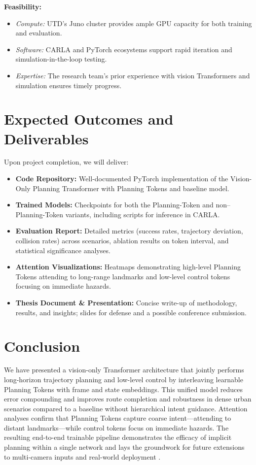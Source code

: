 \documentclass[11pt,a4paper]{article}
\begin{document}
\vspace{1em}

\noindent\textbf{Feasibility:}
\begin{itemize}[nosep]
    \item \emph{Compute:} UTD’s Juno cluster provides ample GPU capacity for both training and evaluation.
    \item \emph{Software:} CARLA and PyTorch ecosystems support rapid iteration and simulation-in-the-loop testing.
    \item \emph{Expertise:} The research team’s prior experience with vision Transformers and simulation ensures timely progress.
\end{itemize}


\section*{Expected Outcomes and Deliverables}
Upon project completion, we will deliver:

\begin{itemize}
    \item \textbf{Code Repository:} Well-documented PyTorch implementation of the Vision-Only Planning Transformer with Planning Tokens and baseline model.
    \item \textbf{Trained Models:} Checkpoints for both the Planning-Token and non–Planning-Token variants, including scripts for inference in CARLA.
    \item \textbf{Evaluation Report:} Detailed metrics (success rates, trajectory deviation, collision rates) across scenarios, ablation results on token interval, and statistical significance analyses.
    \item \textbf{Attention Visualizations:} Heatmaps demonstrating high-level Planning Tokens attending to long-range landmarks and low-level control tokens focusing on immediate hazards.
    \item \textbf{Thesis Document \& Presentation:} Concise write-up of methodology, results, and insights; slides for defense and a possible conference submission.
\end{itemize}

\section*{Conclusion}

We have presented a vision-only Transformer architecture that jointly performs long-horizon trajectory planning and low-level control by interleaving learnable Planning Tokens with frame and state embeddings. This unified model reduces error compounding and improves route completion and robustness in dense urban scenarios compared to a baseline without hierarchical intent guidance. Attention analyses confirm that Planning Tokens capture coarse intent—attending to distant landmarks—while control tokens focus on immediate hazards. The resulting end-to-end trainable pipeline demonstrates the efficacy of implicit planning within a single network and lays the groundwork for future extensions to multi-camera inputs and real-world deployment \cite{Clinton2024planning}.






\end{document}
